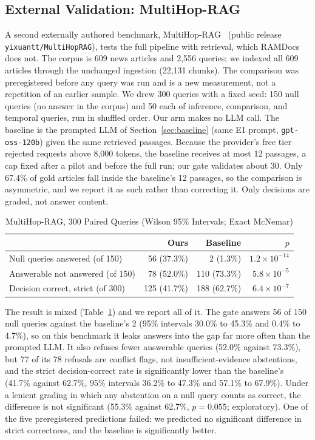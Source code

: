 \documentclass[conference]{IEEEtran}
\begin{document}
\subsection{External Validation: MultiHop-RAG}
\label{sec:multihop}
A second externally authored benchmark, MultiHop-RAG~\cite{tang2024multihoprag}
(public release \texttt{yixuantt/MultiHopRAG}), tests the full pipeline with retrieval, which
RAMDocs does not. The corpus is 609 news articles and 2{,}556 queries; we
indexed all 609 articles through the unchanged ingestion (22{,}131 chunks).
The comparison was preregistered before any query was run and is a new
measurement, not a repetition of an earlier sample. We drew 300 queries with a
fixed seed: 150 null queries (no answer in the corpus) and 50 each of
inference, comparison, and temporal queries, run in shuffled order. Our arm
makes no LLM call. The baseline is the prompted LLM of
Section~\ref{sec:baseline} (same E1 prompt, \texttt{gpt-oss-120b})
given the same retrieved passages. Because the provider's free tier rejected
requests above 8{,}000 tokens, the baseline receives at most 12 passages, a
cap fixed after a pilot and before the full run; our gate validates about 30.
Only 67.4\% of gold articles fall inside the baseline's 12 passages, so the
comparison is asymmetric, and we report it as such rather than correcting it.
Only decisions are graded, not answer content.

\begin{table}[htbp]
\caption{MultiHop-RAG, 300 Paired Queries (Wilson 95\% Intervals; Exact McNemar)}
\label{tab:multihop}
\centering
\small
\begin{tabularx}{\columnwidth}{@{}X r r r@{}}
\toprule
 & Ours & Baseline & $p$ \\
\midrule
Null queries answered (of 150)    & 56 (37.3\%) & 2 (1.3\%)   & $1.2\times10^{-14}$ \\
Answerable not answered (of 150)  & 78 (52.0\%) & 110 (73.3\%) & $5.8\times10^{-5}$ \\
Decision correct, strict (of 300) & 125 (41.7\%) & 188 (62.7\%) & $6.4\times10^{-7}$ \\
\bottomrule
\end{tabularx}
\end{table}

The result is mixed (Table~\ref{tab:multihop}) and we report all of it. The gate answers 56 of 150 null
queries against the baseline's 2 (95\% intervals 30.0\% to 45.3\% and 0.4\%
to 4.7\%), so on this benchmark it leaks answers into the gap far more often
than the prompted LLM. It also refuses fewer answerable queries (52.0\%
against 73.3\%), but 77 of its 78 refusals are conflict flags, not
insufficient-evidence abstentions, and the strict decision-correct rate is
significantly lower than the baseline's (41.7\% against 62.7\%, 95\% intervals
36.2\% to 47.3\% and 57.1\% to 67.9\%). Under a lenient grading in which any
abstention on a null query counts as correct, the difference is not
significant (55.3\% against 62.7\%, $p=0.055$; exploratory). One of the five
preregistered predictions failed: we predicted no significant difference in
strict correctness, and the baseline is significantly better.
\end{document}
